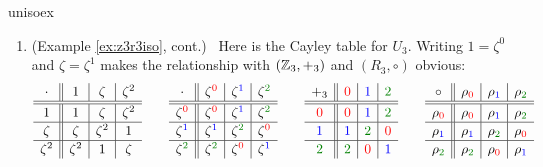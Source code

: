 \begin{examples}{}{unisoex}
\begin{enumerate}
	  
	  \item\label{ex:unisoex2} (Example \ref{ex:z3r3iso}, cont.) \ Here is the Cayley table for $U_3$. Writing $1=\zeta^0$ and $\zeta=\zeta^1$ makes the relationship with $(\mathbb{Z}_3,+_3)$ and $(R_3,\circ)$ obvious:
		\[
			\def\arraystretch{1.1}
			\begin{array}{c||c|c|c}
				\cdot&1&\zeta&\zeta^2\\\hline\hline
				1&1&\zeta&\zeta^2\\\hline
				\zeta&\zeta&\zeta^2&1\\\hline
				\zeta^2&\zeta^2&1&\zeta
			\end{array}
			\qquad
			\begin{array}{c||c|c|c}
				\cdot&\zeta^{\textcolor{red}{0}}&\zeta^{\textcolor{blue}{1}}&\zeta^{\textcolor{Green}{2}}\\\hline\hline
				\zeta^{\textcolor{red}{0}}&\zeta^{\textcolor{red}{0}}&\zeta^{\textcolor{blue}{1}}&\zeta^{\textcolor{Green}{2}}\\\hline
				\zeta^{\textcolor{blue}{1}}&\zeta^{\textcolor{blue}{1}}&\zeta^{\textcolor{Green}{2}}&\zeta^{\textcolor{red}{0}}\\\hline
				\zeta^{\textcolor{Green}{2}}&\zeta^{\textcolor{Green}{2}}&\zeta^{\textcolor{red}{0}}&\zeta^{\textcolor{blue}{1}}
			\end{array}
			\qquad
			\begin{array}{c||c|c|c}
				+_3&\textcolor{red}{0}&\textcolor{blue}{1}&\textcolor{Green}{2}\\\hline\hline
				\textcolor{red}{0}&\textcolor{red}{0}&\textcolor{blue}{1}&\textcolor{Green}{2}\\\hline
				\textcolor{blue}{1}&\textcolor{blue}{1}&\textcolor{Green}{2}&\textcolor{red}{0}\\\hline
				\textcolor{Green}{2}&\textcolor{Green}{2}&\textcolor{red}{0}&\textcolor{blue}{1}
			\end{array}
			\qquad
			\begin{array}{c||c|c|c}
				\circ&\rho_{\textcolor{red}{0}}&\rho_{\textcolor{blue}{1}}&\rho_{\textcolor{Green}{2}}\\\hline\hline
				\rho_{\textcolor{red}{0}}&\rho_{\textcolor{red}{0}}&\rho_{\textcolor{blue}{1}}&\rho_{\textcolor{Green}{2}}\\\hline
				\rho_{\textcolor{blue}{1}}&\rho_{\textcolor{blue}{1}}&\rho_{\textcolor{Green}{2}}&\rho_{\textcolor{red}{0}}\\\hline
				\rho_{\textcolor{Green}{2}}&\rho_{\textcolor{Green}{2}}&\rho_{\textcolor{red}{0}}&\rho_{\textcolor{blue}{1}}

\end{array}\]
\end{enumerate}
\end{examples}
